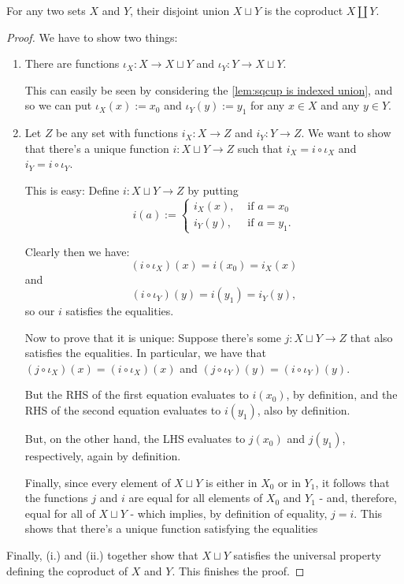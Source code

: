 \begin{prop}
	For any two sets $X$ and $Y$, their disjoint union $X\sqcup Y$ is the coproduct $X\coprod Y$.
\end{prop}
\begin{proof}
	We have to show two things:
	\begin{enumerate}[(i.)]
		\item There are functions $\iota_X:X\to X\sqcup Y$ and $\iota_Y:Y\to X\sqcup Y$.
		
		This can easily be seen by considering the \cref{lem:sqcup is indexed union}, and so we can put $\iota_X(x):=x_0$ and $\iota_Y(y):=y_1$ for any $x\in X$ and any $y\in Y$.
		
		\item Let $Z$ be any set with functions $i_X:X\to Z$ and $i_Y:Y\to Z$. We want to show that there's a unique function $i:X\sqcup Y\to Z$ such that $i_X=i\circ\iota_X$ and $i_Y=i\circ\iota_Y$.
		
		This is easy: Define $i:X\sqcup Y\to Z$ by putting
		\[i(a):=\begin{cases}
		i_X(x),&\mbox{ if }a=x_0\\
		i_Y(y),&\mbox{ if }a=y_1.		
		\end{cases}\]
		
		Clearly then we have:
		\[(i\circ\iota_X)(x)=i(x_0)=i_X(x)\]and
		\[(i\circ\iota_Y)(y)=i(y_1)=i_Y(y),\]so our $i$ satisfies the equalities.
		
		\bigskip
		Now to prove that it is unique: Suppose there's some $j:X\sqcup Y\to Z$ that also satisfies the equalities. In particular, we have that $(j\circ \iota_X)(x)=(i\circ\iota_X)(x)$ and $(j\circ \iota_Y)(y)=(i\circ\iota_Y)(y)$.
		
		But the RHS of the first equation evaluates to $i(x_0)$, by definition, and the RHS of the second equation evaluates to $i(y_1)$, also by definition.
		
		But, on the other hand, the LHS evaluates to $j(x_0)$ and $j(y_1)$, respectively, again by definition.
		
		Finally, since every element of $X\sqcup Y$ is either in $X_0$ or in $Y_1$, it follows that the functions $j$ and $i$ are equal for all elements of $X_0$ and $Y_1$ - and, therefore, equal for all of $X\sqcup Y$ - which implies, by definition of equality, $j=i$. This shows that there's a unique function satisfying the equalities
	\end{enumerate}

	Finally, (i.) and (ii.) together show that $X\sqcup Y$ satisfies the universal property defining the coproduct of $X$ and $Y$. This finishes the proof.
\end{proof}

